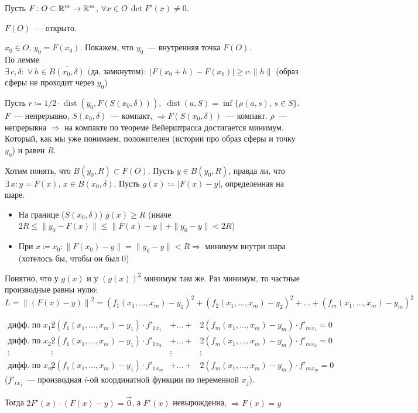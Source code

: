 \begin{Theorem*}
    Пусть $F\colon O\subset\mathbb{R}^{m}\to\mathbb{R}^{m}$, $\forall x\in O\,\det{F'(x)}\neq 0$.
    
    \THEN $F(O)$~--- открыто.
\end{Theorem*}
\begin{Proof}
\newcommand{\dist}{\operatorname{dist}}
    $x_0\in O,\,y_0=F(x_0)$. Покажем, что $y_0$~--- внутренняя точка $F(O)$.\\
    По лемме $\exists\,c, \delta:\;\forall\,h\in \overline{B(x_0, \delta)}\text{ (да, замкнутом)}:\;|F(x_0+h)-F(x_0)|\geqslant c\cdot \|h\|$ (образ сферы не проходит через $y_0$)
    
    Пусть $r\coloneqq 1/2\cdot\dist(y_0, F(S(x_0,\delta))),\;\dist(a, S)=\inf\{\rho(a, s),\,s\in S\}$. $F$~--- непрерывно, $S(x_0,\delta)$~--- компакт, $\Rightarrow F(S(x_0,\delta))$~--- компакт. $\rho$~--- непрерывна $\Rightarrow$ на компакте по теореме Вейерштрасса достигается минимум. Который, как мы уже понимаем, положителен (истории про образ сферы и точку $y_0$) и равен $R$.
    
    Хотим понять, что $B(y_0, R)\subset F(O)$. Пусть $y\in B(y_0, R)$, правда ли, что $\exists\,x:y=F(x),\,x\in B(x_0,\delta)$. Пусть $g(x)\coloneqq|F(x)-y|$, определенная на шаре.
    \begin{itemize}
        \item На границе ($S(x_0, \delta)$) $g(x)\geqslant R$ (иначе $2R\leqslant\|y_0-F(x)\|\leqslant\|F(x)-y\|+\|y_0-y\|<2R$)
        \item При $x\coloneqq x_0: \|F(x_0)-y\|=\|y_0-y\|<R\Rightarrow$ минимум внутри шара (хотелось бы, чтобы он был $0$)
    \end{itemize}
\newcommand{\xOneM}{(x_1,\ldots,x_m)}
    Понятно, что у $g(x)$ и у ${(g(x))}^2$ минимум там же. Раз минимум, то частные производные равны нулю: $L={\|(F(x)-y)\|}^2={(f_1\xOneM-y_1)}^2+{(f_2\xOneM-y_2)}^2+\ldots+{(f_m\xOneM-y_m)}^2$
    
    $$\begin{array}{cccc}
		\text{дифф. по $x_1$:} & 2(f_1\xOneM-y_1)\cdot f'{}_1{}_{x_1} & +\ldots+ & 2(f_m\xOneM-y_m)\cdot f'{}_m{}_{x_1} = 0\\
		\text{дифф. по $x_2$:} & 2(f_1\xOneM-y_1)\cdot f'{}_1{}_{x_2} & +\ldots+ & 2(f_m\xOneM-y_m)\cdot f'{}_m{}_{x_2} = 0\\
		\vdots& \vdots &\vdots & \vdots\\
		\text{дифф. по $x_m$:} & 2(f_1\xOneM-y_1)\cdot f'{}_1{}_{x_m} & +\ldots+ & 2(f_m\xOneM-y_m)\cdot f'{}_m{}_{x_m} = 0
	\end{array}$$
	($f'{}_i{}_{x_j}$~--- производная $i$-ой координатной функции по переменной $x_j$).
	
	Тогда $2F'(x)\cdot(F(x)-y)=\vec{0}$, а $F'(x)$ невырожденна, $\Rightarrow F(x)=y$
\end{Proof}

